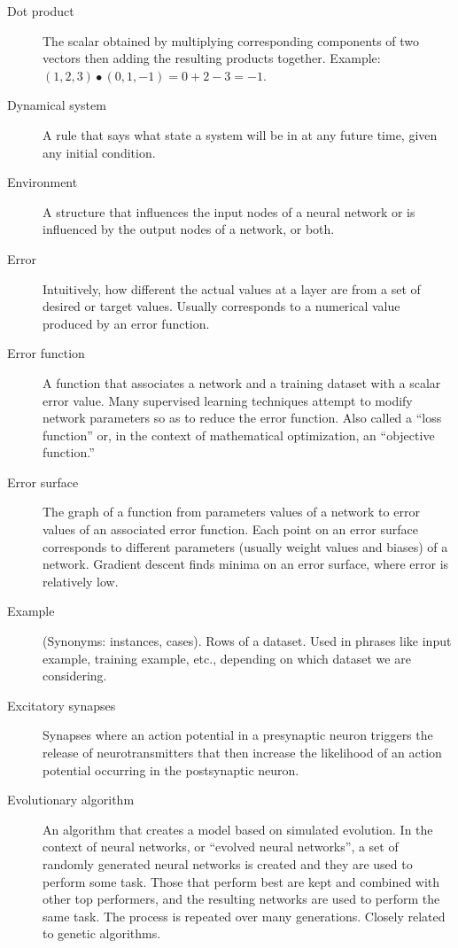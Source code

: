 \begin{description}
\item[Dot product] The scalar obtained by multiplying corresponding components of two vectors then adding the resulting products together. Example: $(1,2,3) \bullet (0,1,-1) = 0+2-3 = -1$.

\item[Dynamical system] A rule that says what state a system will be in at any future time, given any initial condition.

\item[Environment] A structure that influences the input nodes of a neural network or is influenced by the output nodes of a network, or both.

\item[Error] Intuitively, how different the actual values at a layer are from a set of desired or target values. Usually corresponds to a numerical value produced by an error function.

\item[Error function] A function that associates a network and a training dataset with a scalar error value. Many supervised learning techniques attempt to modify network parameters so as to reduce the error function. Also called a ``loss function'' or, in the context of mathematical optimization, an ``objective function.''

\item[Error surface] The graph of a function from parameters values of a network to error values of an associated error function. Each point on an error surface corresponds to different parameters (usually weight values and biases) of a network. Gradient descent finds minima on an error surface, where error is relatively low.

\item[Example] (Synonyms: instances, cases). Rows of a dataset. Used in phrases like input example, training example, etc., depending on which dataset we are considering.

\item[Excitatory synapses] Synapses where an action potential in a presynaptic neuron triggers the release of neurotransmitters that then increase the likelihood of an action potential occurring in the postsynaptic neuron.

\item[Evolutionary algorithm] An algorithm that creates a model based on simulated evolution. In the context of neural networks, or ``evolved neural networks'', a set of randomly generated neural networks is created and they are used to perform some task.  Those that perform best are kept and combined with other top performers, and the resulting networks are used to perform the same task. The process is repeated over many generations. Closely related to genetic algorithms.


\end{description}
